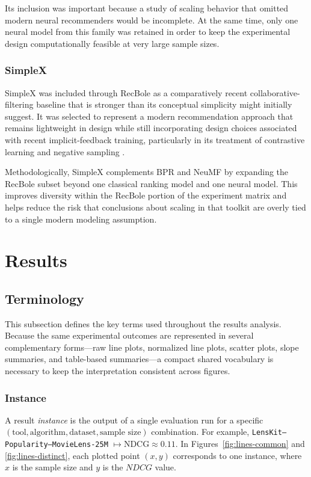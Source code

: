 \documentclass[12pt,a4paper]{article}
\begin{document}
Its inclusion was important because a study of scaling behavior that omitted modern neural recommenders would be incomplete. At the same time, only one neural model from this family was retained in order to keep the experimental design computationally feasible at very large sample sizes.

\subsubsection{SimpleX}
SimpleX was included through RecBole as a comparatively recent collaborative-filtering baseline that is stronger than its conceptual simplicity might initially suggest. It was selected to represent a modern recommendation approach that remains lightweight in design while still incorporating design choices associated with recent implicit-feedback training, particularly in its treatment of contrastive learning and negative sampling \cite{simplex}.

Methodologically, SimpleX complements BPR and NeuMF by expanding the RecBole subset beyond one classical ranking model and one neural model. This improves diversity within the RecBole portion of the experiment matrix and helps reduce the risk that conclusions about scaling in that toolkit are overly tied to a single modern modeling assumption.

\section{Results}
\subsection{Terminology}
This subsection defines the key terms used throughout the results analysis. Because the same experimental outcomes are represented in several complementary forms---raw line plots, normalized line plots, scatter plots, slope summaries, and table-based summaries---a compact shared vocabulary is necessary to keep the interpretation consistent across figures.

\subsubsection{Instance}
A result \emph{instance} is the output of a single evaluation run for a specific
$(\text{tool}, \text{algorithm}, \text{dataset}, \text{sample size})$ combination.
For example, \texttt{LensKit--Popularity--MovieLens-25M} $\mapsto \mathrm{NDCG} \approx 0.11$.
In Figures~\ref{fig:lines-common} and \ref{fig:lines-distinct}, each plotted point $(x,y)$ corresponds to one instance, where
$x$ is the sample size and $y$ is the $NDCG$ value.
\end{document}
